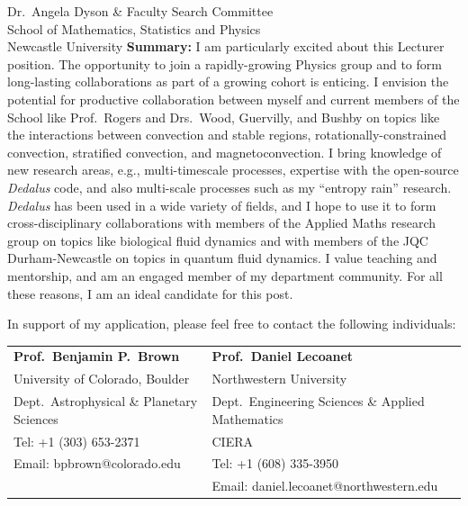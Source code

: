 \documentclass[12pt, a4paper]{letter}
\begin{document}
\begin{letter}{
        Dr.~Angela Dyson \& Faculty Search Committee \\
        School of Mathematics, Statistics and Physics \\
        Newcastle University}
    \textbf{Summary: } I am particularly excited about this Lecturer position.
    The opportunity to join a rapidly-growing Physics group and to form long-lasting collaborations as part of a growing cohort is enticing.
    I envision the potential for productive collaboration between myself and current members of the School like Prof.~Rogers and Drs.~Wood, Guervilly, and Bushby on topics like the interactions between convection and stable regions, rotationally-constrained convection, stratified convection, and magnetoconvection.
    I bring knowledge of new research areas, e.g., multi-timescale processes, expertise with the open-source \emph{Dedalus} code, and also multi-scale processes such as my ``entropy rain'' research.
    \emph{Dedalus} has been used in a wide variety of fields, and I hope to use it to form cross-disciplinary collaborations with members of the Applied Maths research group on topics like biological fluid dynamics and with members of the JQC Durham-Newcastle on topics in quantum fluid dynamics.
    I value teaching and mentorship, and am an engaged member of my department community.
    For all these reasons, I am an ideal candidate for this post.

    In support of my application, please feel free to contact the following individuals:

    \footnotesize
    \begin{tabular}{ll}
        \textbf{Prof.~Benjamin P.~Brown}                        &\hspace{0.25in} \textbf{Prof.~Daniel Lecoanet}                     \\
        University of Colorado, Boulder                         &\hspace{0.25in} Northwestern University    \\
        \hspace{0.2in}Dept.~Astrophysical \& Planetary Sciences &\hspace{0.45in} Dept.~Engineering Sciences \& Applied Mathematics \\
        Tel: +1 (303) 653-2371                                    &\hspace{0.45in} CIERA                          \\
        Email: bpbrown@colorado.edu                             &\hspace{0.25in} Tel: +1 (608) 335-3950 \\
                                                                &\hspace{0.25in} Email: daniel.lecoanet@northwestern.edu             \\


\end{tabular}
\end{letter}
\end{document}
